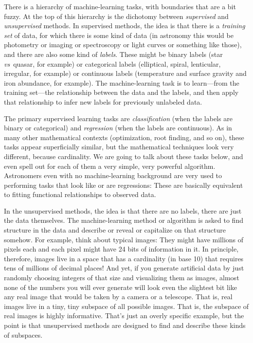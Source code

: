 \documentclass[12pt, twoside, letterpaper]{article}
\newcommand{\foreign}[1]{\textsl{#1}}
\newcommand{\vs}{\foreign{vs}}
\begin{document}
There is a hierarchy of machine-learning tasks, with boundaries that
are a bit fuzzy.
At the top of this hierarchy is the dichotomy between \emph{supervised}
and \emph{unsupervised} methods.
In supervised methods, the idea is that there is a \emph{training set}
of data, for which there is some kind of data (in astronomy this would
be photometry or imaging or spectroscopy or light curves or something like those),
and there are also some kind of \emph{labels}.
These might be binary labels (star \vs\ quasar, for example) or
categorical labels (elliptical, spiral, lenticular, irregular, for
example) or continuous labels (temperature and surface gravity and
iron abundance, for example).
The machine-learning task is to learn---from the training set---the
relationship between the data and the labels, and then apply that
relationship to infer new labels for previously unlabeled data.

The primary supervised learning tasks are \emph{classification} (when
the labels are binary or categorical) and \emph{regression} (when the
labels are continuous).
As in many other mathematical contexts (optimization, root finding,
and so on), these tasks appear superficially similar, but the mathematical
techniques look very different, because cardinality.
We are going to talk about these tasks below, and even spell out for
each of them a very simple, very powerful algorithm.
Astronomers even with no machine-learning background are very used
to performing tasks that look like or are regressions:
These are basically equivalent to fitting functional relationships to
observed data.

In the unsupervised methods, the idea is that there are no labels,
there are just the data themselves.
The machine-learning method or algorithm is asked to find
structure in the data and describe or reveal or capitalize on that
structure somehow.
For example, think about typical images: They might have millions
of pixels each and each pixel might have 24 bits of information in it.
In principle, therefore, images live in a space that has a cardinality
(in base 10) that requires tens of millions of decimal places!
And yet, if you generate artificial data by just randomly choosing
integers of that size and visualizing them as images, almost none of
the numbers you will ever generate will look even the slightest bit
like any real image that would be taken by a camera or a telescope.
That is, real images live in a tiny, tiny subspace of all possible
images.
That is, the subspace of real images is highly informative.
That's just an overly specific example, but the point is that
unsupervised methods are designed to find and describe these kinds of subspaces.
\end{document}
